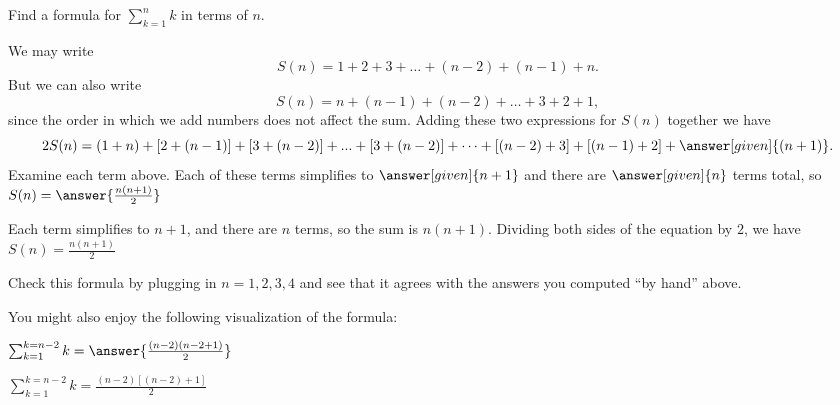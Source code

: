 \documentclass{ximera}
\begin{document}
\begin{question}
	Find a formula for $\sum_{k=1}^{n} k$ in terms of $n$.

          We may write
          \[
          S(n) = 1+2+3+\dots+(n-2)+(n-1)+n.
          \]
	  But we can also write
          \[
          S(n) = n+(n-1)+(n-2)+\dots+3+2+1,
          \]
          since the order in which we add numbers does not affect the sum. Adding these two expressions for $S(n)$ together we have
          \[
          2S(n) = (1+n)+[2+(n-1)]+[3+(n-2)]+...+[3+(n-2)]+\dots+[(n-2)+3]+[(n-1)+2]+\answer[given]{(n+1)}.
          \]
          Examine each term above. Each of these terms simplifies to
          $\answer[given]{n+1}$ and there are $\answer[given]{n}$
          terms total, so $S(n) = \answer{\frac{n(n+1)}{2}}$
	 \begin{hint}
	 	 Each term simplifies to $n+1$, and there are $n$ terms, so the sum is $n(n+1)$.  Dividing both sides of the equation by $2$, we have $S(n) = \frac{n(n+1)}{2}$
	 \end{hint}
	 
	 Check this formula by plugging in $n=1,2,3,4$ and see that it agrees with the answers you computed ``by hand'' above.
	 
	 \begin{multipleChoice}
	 \end{multipleChoice}
	 
	 You might also enjoy the following visualization of the formula:
	 

	
\end{question}




\begin{question}
	$\sum_{k=1}^{k=n-2} k = \answer{ \frac{(n-2)(n-2+1)}{2} }$
	\begin{hint}
		$\sum_{k=1}^{k=n-2} k = \frac{(n-2)[(n-2)+1]}{2} $
	\end{hint}
\end{question}
\end{document}
